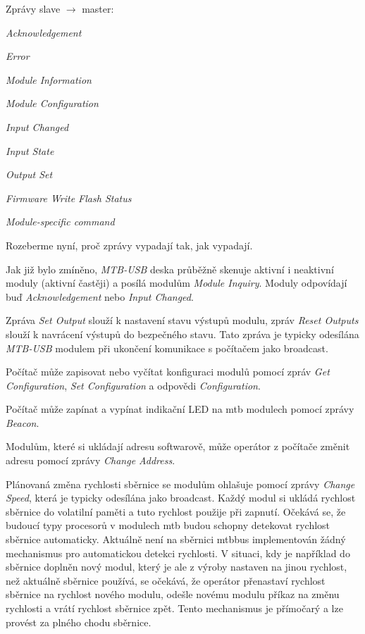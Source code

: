 Zprávy slave $\rightarrow$ master:

\begin{compactitem}
\item \textit{Acknowledgement}
\item \textit{Error}
\item \textit{Module Information}
\item \textit{Module Configuration}
\item \textit{Input Changed}
\item \textit{Input State}
\item \textit{Output Set}
\item \textit{Firmware Write Flash Status}
\item \textit{Module-specific command}
\end{compactitem}



Rozeberme nyní, proč zprávy vypadají tak, jak vypadají.

Jak již bylo zmíněno, \textit{MTB-USB} deska průběžně skenuje aktivní
i neaktivní moduly (aktivní častěji) a posílá modulům \textit{Module Inquiry}.
Moduly odpovídají buď \textit{Acknowledgement} nebo \textit{Input Changed}.

Zpráva \textit{Set Output} slouží k nastavení stavu výstupů modulu, zpráv
\textit{Reset Outputs} slouží k navrácení výstupů do bezpečného stavu.
Tato zpráva je typicky odesílána \textit{MTB-USB} modulem při ukončení komunikace
s počítačem jako broadcast.

Počítač může zapisovat nebo vyčítat konfiguraci modulů pomocí zpráv
\textit{Get Configuration}, \textit{Set Configuration} a odpovědi
\textit{Configuration}.

Počítač může zapínat a vypínat indikační LED na \gls{mtb} modulech pomocí
zprávy \textit{Beacon}.

Modulům, které si ukládají adresu softwarově, může operátor z počítače změnit
adresu pomocí zprávy \textit{Change Address}.

Plánovaná změna rychlosti sběrnice se modulům ohlašuje pomocí zprávy
\textit{Change Speed}, která je typicky odesílána jako broadcast. Každý modul
si ukládá rychlost sběrnice do volatilní paměti a tuto rychlost použije při
zapnutí. Očekává se, že budoucí typy procesorů v modulech \gls{mtb} budou
schopny detekovat rychlost sběrnice automaticky. Aktuálně není na sběrnici
\gls{mtbbus} implementován žádný mechanismus pro automatickou detekci rychlosti.
V situaci, kdy je například do sběrnice doplněn nový modul, který je ale z
výroby nastaven na jinou rychlost, než aktuálně sběrnice používá, se očekává,
že operátor přenastaví rychlost sběrnice na rychlost nového modulu, odešle
novému modulu příkaz na změnu rychlosti a vrátí rychlost sběrnice zpět.
Tento mechanismus je přímočarý a lze provést za plného chodu sběrnice.


